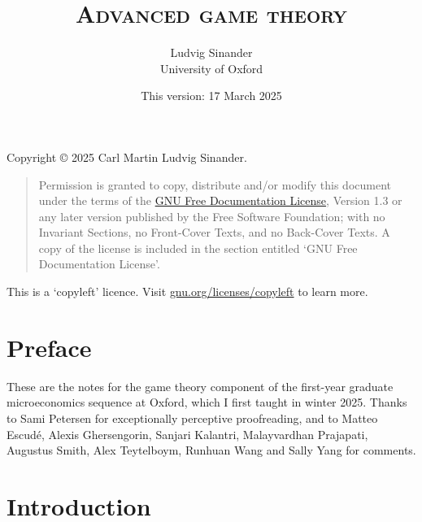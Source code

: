 \documentclass[11pt,letterpaper,reqno,oneside]{book}
\title{\scshape Advanced game theory}
\author{Ludvig Sinander \\
University of Oxford}
\date{\small This version: 17 March 2025}
\begin{document}
\maketitle

\pagebreak
\hspace{1pt}\vfill
\noindent
Copyright \copyright{} 2025 Carl Martin Ludvig Sinander.

\begin{quotation}
\noindent
Permission is granted to copy, distribute and/or modify this document under the terms of the \href{https://www.gnu.org/licenses/fdl}{GNU Free Documentation License}, Version 1.3 or any later version published by the Free Software Foundation; with no Invariant Sections, no Front-Cover Texts, and no Back-Cover Texts. A copy of the license is included in the section entitled `GNU
Free Documentation License'.
\end{quotation}

\noindent
This is a `copyleft' licence.
Visit \href{https://www.gnu.org/licenses/copyleft}{gnu.org/licenses/copyleft} to learn more.



\chapter*{Preface}
\label{preface}

These are the notes for the game theory component of the first-year graduate microeconomics sequence at Oxford, which I first taught in winter 2025.
Thanks to Sami Petersen for exceptionally perceptive proofreading, and to Matteo Escudé, Alexis Ghersengorin, Sanjari Kalantri, Malayvardhan Prajapati, Augustus Smith, Alex Teytelboym, Runhuan Wang and Sally Yang for comments.



\pagebreak
{}
\setcounter{tocdepth}{1}
\tableofcontents
{}



\setcounter{chapter}{-1}
\chapter{Introduction}
\label{ch0}
\end{document}
